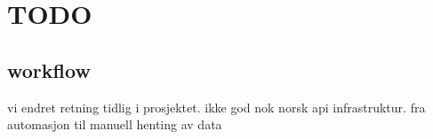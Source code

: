 \section{TODO}

\subsection{workflow}
vi endret retning tidlig i prosjektet. ikke god nok norsk api infrastruktur.
fra automasjon til manuell henting av data